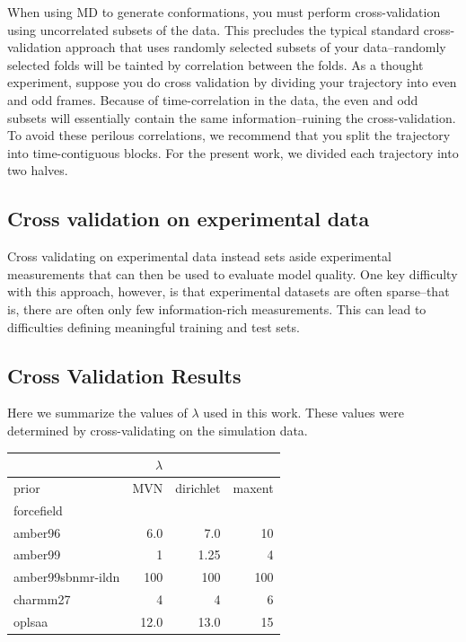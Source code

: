 \documentclass[12pt]{article}
\begin{document}
When using MD to generate conformations, you must perform cross-validation using uncorrelated subsets of the data.  This precludes the typical standard cross-validation approach that uses randomly selected subsets of your data--randomly selected folds will be tainted by correlation between the folds.  As a thought experiment, suppose you do cross validation by dividing your trajectory into even and odd frames.  Because of time-correlation in the data, the even and odd subsets will essentially contain the same information--ruining the cross-validation.  To avoid these perilous correlations, we recommend that you split the trajectory into time-contiguous blocks.  For the present work, we divided each trajectory into two halves.  

\subsection*{Cross validation on experimental data}

Cross validating on experimental data instead sets aside experimental measurements that can then be used to evaluate model quality.  One key difficulty with this approach, however, is that experimental datasets are often sparse--that is, there are often only few information-rich measurements.  This can lead to difficulties defining meaningful training and test sets.  

\subsection*{Cross Validation Results}

Here we summarize the values of $\lambda$ used in this work.  These values were determined by cross-validating on the simulation data.  

\vspace{5mm}

\begin{tabular}{lrrr}
\toprule
{}                &$\lambda$  &   &      \\
\midrule
prior &       MVN &  dirichlet & maxent \\
forcefield        &           &         \\
amber96           &      6.0  &    7.0  & 10 \\
amber99           &      1  &    1.25 & 4 \\
amber99sbnmr-ildn &      100  &    100  & 100 \\
charmm27          &      4  &   4 & 6 \\
oplsaa            &     12.0 &    13.0 & 15 \\
\bottomrule
\end{tabular}
\end{document}
